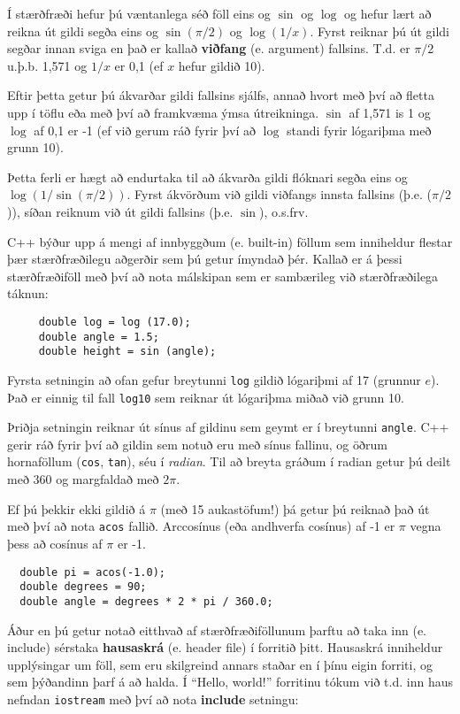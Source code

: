 Í stærðfræði hefur þú væntanlega séð föll eins og $\sin$ og $\log$ og hefur lært að reikna út gildi segða eins og $\sin(\pi/2)$ og $\log(1/x)$.
Fyrst reiknar þú út gildi segðar innan sviga en það er kallað {\bf viðfang} (e. argument) fallsins.
T.d. er $\pi/2$ u.þ.b. 1,571 og $1/x$ er 0,1 (ef $x$ hefur gildið 10).

Eftir þetta getur þú ákvarðar gildi fallsins sjálfs, annað hvort með því að fletta upp í töflu eða með því að framkvæma ýmsa útreikninga.
$\sin$ af 1,571 is 1 og $\log$ af 0,1 er -1 (ef við gerum ráð fyrir því að $\log$ standi fyrir 
lógariþma með grunn 10).

Þetta ferli er hægt að endurtaka til að ákvarða gildi flóknari segða eins og $\log(1/\sin(\pi/2))$.
Fyrst ákvörðum við gildi viðfangs innsta fallsins (þ.e. ($\pi/2$)), síðan reiknum við út gildi fallsins (þ.e. $\sin$), o.s.frv.

C++ býður upp á mengi af innbyggðum (e. built-in) föllum sem inniheldur flestar þær stærðfræðilegu aðgerðir sem þú getur ímyndað þér.
Kallað er á þessi stærðfræðiföll með því að nota málskipan sem er sambærileg við stærðfræðilega táknun: 

\begin{verbatim}
     double log = log (17.0);
     double angle = 1.5;
     double height = sin (angle);
\end{verbatim}
%

Fyrsta setningin að ofan gefur breytunni {\tt log} gildið lógariþmi af 17 (grunnur $e$).
Það er einnig til fall {\tt log10} sem reiknar út lógariþma miðað við grunn 10.

Þriðja setningin reiknar út sínus af gildinu sem geymt er í breytunni {\tt angle}.
C++ gerir ráð fyrir því að gildin sem notuð eru með sínus fallinu, og öðrum hornaföllum ({\tt cos}, {\tt tan}), séu í {\em radian}.
Til að breyta gráðum í radian getur þú deilt með 360 og margfaldað með $2 \pi$.  

Ef þú þekkir ekki gildið á $\pi$ (með 15 aukastöfum!) þá getur þú reiknað það út með því að nota {\tt acos} fallið.
Arccosínus (eða andhverfa cosínus) af -1 er $\pi$ vegna þess að cosínus af $\pi$ er -1.

\begin{verbatim}
  double pi = acos(-1.0);
  double degrees = 90;
  double angle = degrees * 2 * pi / 360.0;
\end{verbatim}
%
Áður en þú getur notað eitthvað af stærðfræðiföllunum þarftu að taka inn (e. include) sérstaka {\bf hausaskrá} (e. header file) í forritið þitt.
Hausaskrá inniheldur upplýsingar um föll, sem eru skilgreind annars staðar en í þínu eigin forriti, og sem þýðandinn þarf á að halda.
Í ``Hello, world!'' forritinu tókum við t.d. inn haus nefndan {\tt iostream} með því að nota {\bf include} setningu:


